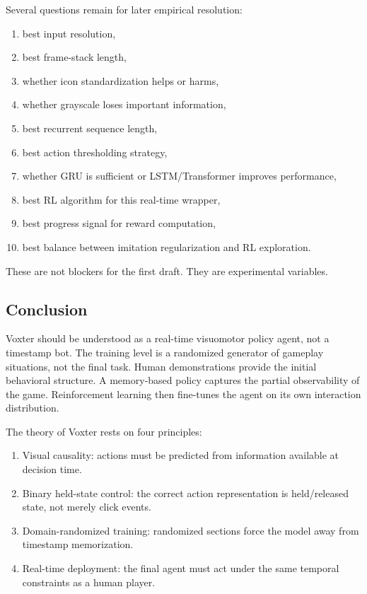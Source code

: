 \documentclass[11pt]{article}
\begin{document}
Several questions remain for later empirical resolution:
\begin{enumerate}
  \item best input resolution,
  \item best frame-stack length,
  \item whether icon standardization helps or harms,
  \item whether grayscale loses important information,
  \item best recurrent sequence length,
  \item best action thresholding strategy,
  \item whether GRU is sufficient or LSTM/Transformer improves performance,
  \item best RL algorithm for this real-time wrapper,
  \item best progress signal for reward computation,
  \item best balance between imitation regularization and RL exploration.
\end{enumerate}

These are not blockers for the first draft. They are experimental variables.

\subsection{Conclusion}

Voxter should be understood as a real-time visuomotor policy agent, not a timestamp bot. The training level is a randomized generator of gameplay situations, not the final task. Human demonstrations provide the initial behavioral structure. A memory-based policy captures the partial observability of the game. Reinforcement learning then fine-tunes the agent on its own interaction distribution.

The theory of Voxter rests on four principles:
\begin{enumerate}
  \item Visual causality: actions must be predicted from information available at decision time.
  \item Binary held-state control: the correct action representation is held/released state, not merely click events.
  \item Domain-randomized training: randomized sections force the model away from timestamp memorization.
  \item Real-time deployment: the final agent must act under the same temporal constraints as a human player.
\end{enumerate}
\end{document}

